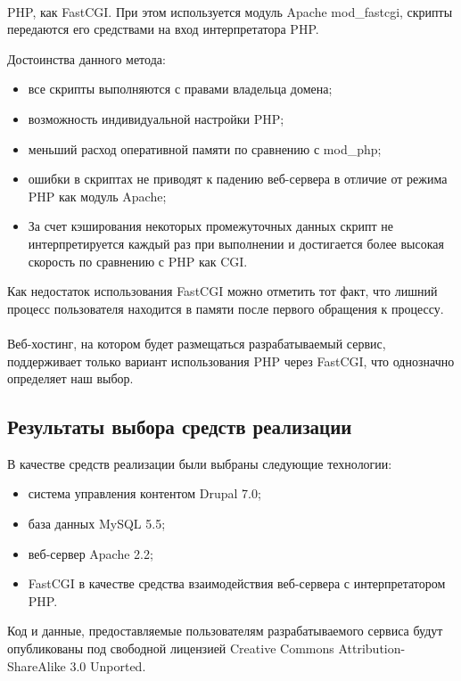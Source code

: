 \paragraph{}
PHP, как FastCGI. При этом используется модуль Apache mod\_fastcgi,
скрипты передаются его средствами на вход интерпретатора PHP.

Достоинства данного метода:
\begin{itemize}
\item
  все скрипты выполняются с правами владельца домена;
\item
  возможность индивидуальной настройки PHP;
\item
  меньший расход оперативной памяти по сравнению с mod\_php;
\item
  ошибки в скриптах не приводят к падению веб-сервера в отличие от режима PHP как модуль Apache;
\item
  За счет кэширования некоторых промежуточных данных скрипт не интерпретируется каждый раз при выполнении
  и достигается более высокая скорость по сравнению с PHP как CGI.
\end{itemize}

Как недостаток использования FastCGI можно отметить тот факт,
что лишний процесс пользователя находится в памяти после первого обращения
к процессу.

\paragraph{}
Веб-хостинг, на котором будет размещаться разрабатываемый сервис, поддерживает только вариант использования PHP через FastCGI,
что однозначно определяет наш выбор.

\subsection{Результаты выбора средств реализации}
\label{ssec:choice_results}

В качестве средств реализации были выбраны следующие технологии:
\begin{itemize}
\item система управления контентом Drupal 7.0;
\item база данных MySQL 5.5;
\item веб-сервер Apache 2.2;
\item FastCGI в качестве средства взаимодействия веб-сервера
  с интерпретатором PHP.

\end{itemize}

Код и данные, предоставляемые пользователям разрабатываемого сервиса
будут опубликованы под свободной лицензией
Creative Commons Attribution-ShareAlike 3.0 Unported.